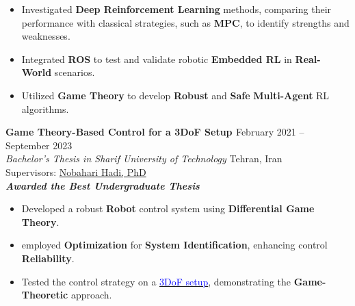 \documentclass[12pt]{article}
\begin{document}
\begin{itemize}  \itemsep -4pt %
	\item Investigated \textbf{Deep Reinforcement Learning} methods, comparing their performance with classical strategies, such as \textbf{MPC}, to identify strengths and weaknesses.
	\item Integrated \textbf{ROS} to test and validate robotic \textbf{Embedded RL} in \textbf{Real-World} scenarios.
	\item Utilized \textbf{Game Theory} to develop \textbf{Robust} and \textbf{Safe}
	\textbf{Multi-Agent}
	 RL algorithms.
\end{itemize}

\vspace{-4pt}
\noindent
{\bfseries Game Theory-Based Control for a 3DoF Setup
\href{https://github.com/alibaniasad1999/bachelor-thesis}{\faGithub}
\textcolor{red}{
\href{https://youtu.be/SXZACxGaE1A?si=61yCRB8jFIZlldFG}{\faYoutube}}
} \hfill February 2021 -- September 2023 \\
\noindent \textit{Bachelor's Thesis in Sharif University of Technology} \hfill Tehran, Iran \\
\noindent Supervisors:
\href{https://ae.sharif.edu/~portal/faculty/1091235256}{Nobahari Hadi, PhD} \\
{\footnotesize \textbf{\textit{Awarded the Best Undergraduate Thesis \faMedal}}}
\vspace{-8pt}
\begin{itemize} \itemsep -4pt %
    \item Developed a robust \textbf{Robot} control system using \textbf{Differential Game Theory}.
	 \item employed \textbf{Optimization} for \textbf{System Identification}, enhancing control \textbf{Reliability}.
    \item Tested the control strategy on a \href{https://gcrc.sharif.edu/استند-آزمایشگاهی-کنترل-وضعیت-سه-درجه-آ/}{\textcolor{blue}{3DoF setup}}, demonstrating the \textbf{Game-Theoretic} approach.

\end{itemize}
\end{document}
